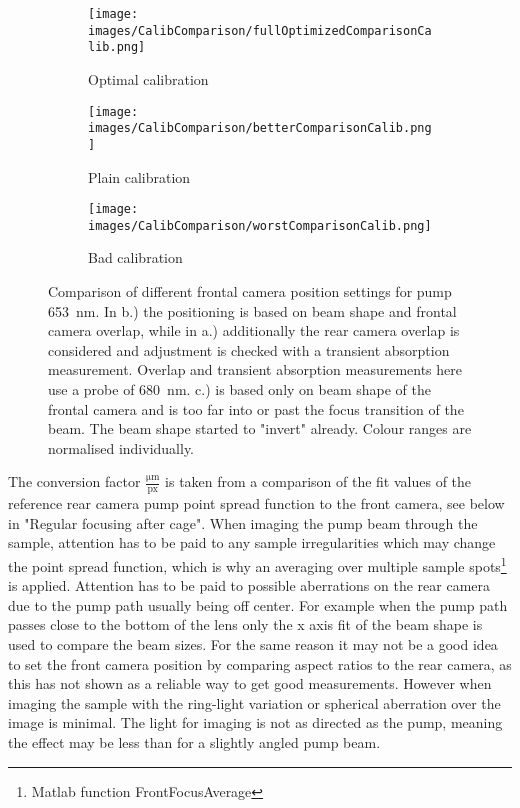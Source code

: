 \documentclass[twoside,openright,listof=numbered]{scrreprt}
\begin{document}
\begin{figure}[hbtp]
\centering
\begin{subfigure}[b]{0.32\linewidth}
\texttt{[image: images/CalibComparison/fullOptimizedComparisonCalib.png]} 
\caption{Optimal calibration}
\end{subfigure}\hfill
\begin{subfigure}[b]{0.32\linewidth}
\texttt{[image: images/CalibComparison/betterComparisonCalib.png]} 
\caption{Plain calibration}
\end{subfigure}\hfill
\begin{subfigure}[b]{0.32\linewidth}
\texttt{[image: images/CalibComparison/worstComparisonCalib.png]}
\caption{Bad calibration}
\end{subfigure}
\caption[Comparison of different frontal camera position settings for calibration process.]{Comparison of different frontal camera position settings for pump \qty{653}{\nano\meter}. In b.) the positioning is based on beam shape and frontal camera overlap, while in a.) additionally the rear camera overlap is considered and adjustment is checked with a transient absorption measurement. Overlap and transient absorption measurements here use a probe of \qty{680}{\nano\meter}. c.) is based only on beam shape of the frontal camera and is too far into or past the focus transition of the beam. The beam shape started to "invert" already. Colour ranges are normalised individually.\label{fig:pumpCalibComparison}}
\end{figure}

The conversion factor $\frac{\si{\micro\meter}}{\text{px}}$ is taken from a comparison of the fit values of the reference rear camera pump point spread function to the front camera, see below in "Regular focusing after cage". When imaging the pump beam through the sample, attention has to be paid to any sample irregularities which may change the point spread function, which is why an averaging over multiple sample spots\footnote{Matlab function FrontFocusAverage} is applied. Attention has to be paid to possible aberrations on the rear camera due to the pump path usually being off center. For example when the pump path passes close to the bottom of the lens only the x axis fit of the beam shape is used to compare the beam sizes. For the same reason it may not be a good idea to set the front camera position by comparing aspect ratios to the rear camera, as this has not shown as a reliable way to get good measurements. However when imaging the sample with the ring-light variation or spherical aberration over the image is minimal. The light for imaging is not as directed as the pump, meaning the effect may be less than for a slightly angled pump beam. 
\end{document}

